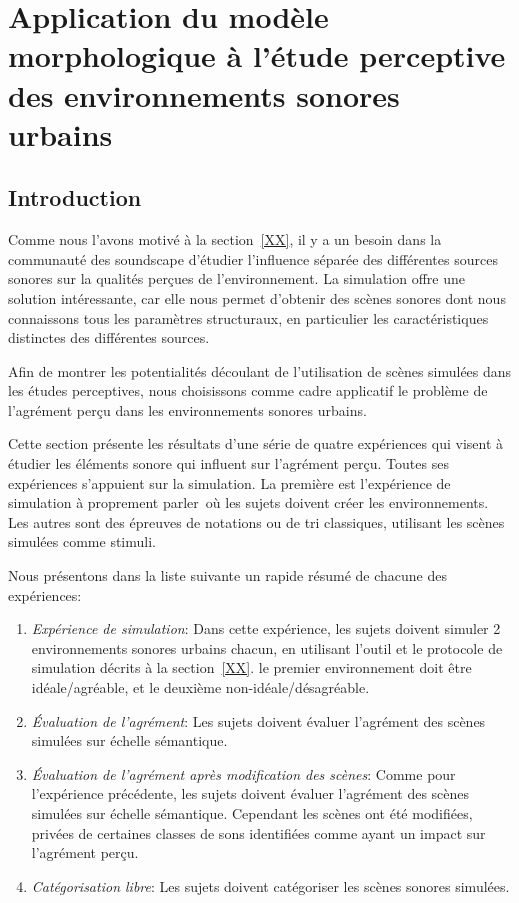 \chapter[Application à l’étude perceptive des environnements sonores urbains]{Application du modèle morphologique à l’étude perceptive des environnements sonores urbains}\label{ch:psycho_xp}

\section{Introduction}

Comme nous l'avons motivé à la section~\ref{XX}, il y a un besoin dans la communauté des soundscape d'étudier l'influence séparée des différentes sources sonores sur la qualités perçues de l'environnement. La simulation offre une solution intéressante, car elle nous permet d'obtenir des scènes sonores dont nous connaissons tous les paramètres structuraux, en particulier les caractéristiques distinctes des différentes sources.

Afin de montrer les potentialités découlant de l'utilisation de scènes simulées dans les études perceptives, nous choisissons comme cadre applicatif le problème de l'agrément perçu dans les environnements sonores urbains. 

Cette section présente les résultats d'une série de quatre expériences qui visent à étudier les éléments sonore qui influent sur l'agrément perçu. Toutes ses expériences s'appuient sur la simulation. La première est l'expérience de simulation à proprement parler\ie~où les sujets doivent créer les environnements. Les autres sont des épreuves de notations ou de tri classiques, utilisant les scènes simulées comme stimuli. 

Nous présentons dans la liste suivante un rapide résumé de chacune des expériences:

\begin{enumerate}
\item \emph{Expérience de simulation}: Dans cette expérience, les sujets doivent simuler 2 environnements sonores urbains chacun, en utilisant l'outil et le protocole de simulation décrits à la section~\ref{XX}. le premier environnement doit être idéale/agréable, et le deuxième non-idéale/désagréable.
\item \emph{Évaluation de l'agrément}: Les sujets doivent évaluer l'agrément des scènes simulées sur échelle sémantique.
\item \emph{Évaluation de l'agrément après modification des scènes}: Comme pour l'expérience précédente, les sujets doivent évaluer l'agrément des scènes simulées sur échelle sémantique. Cependant les scènes ont été modifiées, privées de certaines classes de sons identifiées comme ayant un impact sur l'agrément perçu. 
\item \emph{Catégorisation libre}: Les sujets doivent catégoriser les scènes sonores simulées.
\end{enumerate}

